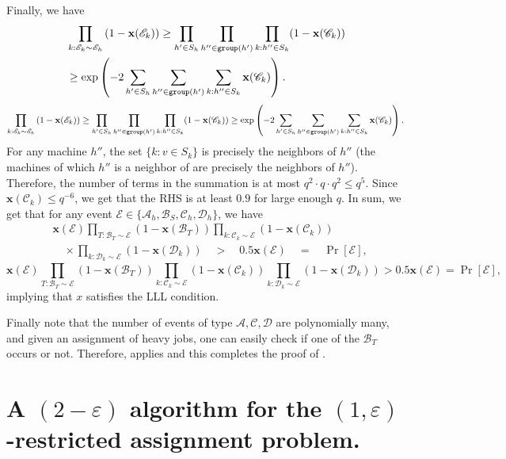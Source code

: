 \documentclass[11pt]{article}
\newcommand{\cA}{{\mathscr A}}
\newcommand{\cB}{\mathscr{B}}
\newcommand{\cC}{{\mathscr C}}
\newcommand{\cD}{\mathscr{D}}
\newcommand{\cE}{{\mathscr E}}
\newcommand{\eps}{\varepsilon}
\newcommand{\x}{{\mathbf x}}
\begin{document}
Finally, we have
\ifdefined\CR
\begin{align*}
&\prod_{k:\cE_k\sim \cE_h}\left(1-\x(\cE_k)\right) \geq \prod_{h' \in S_h} \prod_{h'' \in \group(h')} \prod_{k: h''\in S_k} (1-\x(\cC_k))\\
 &\geq \exp\left(-2\sum_{h'\in S_h}\sum_{h''\in \group(h')}\sum_{k: h''\in S_k} \x(\cC_k)\right).
\end{align*}
\else
$$\prod_{k:\cE_k\sim \cE_h}\left(1-\x(\cE_k)\right) \geq \prod_{h' \in S_h} \prod_{h'' \in \group(h')} \prod_{k: h''\in S_k} (1-\x(\cC_k)) \geq \exp\left(-2\sum_{h'\in S_h}\sum_{h''\in \group(h')}\sum_{k: h''\in S_k} \x(\cC_k)\right).$$
\fi
For any machine $h''$, the set $\{k: v\in S_k\}$ is precisely the neighbors of $h''$ (the machines of which $h''$ is a neighbor of are precisely the neighbors of $h''$). Therefore, the number of terms in the summation is at most 
$q^2\cdot q\cdot q^2 \leq q^5$. Since $\x(\cC_k) \leq q^{-6}$, we get that the RHS is at least $0.9$ for large enough $q$. In sum, we get that for any event $\cE \in \{\cA_h, \cB_S,\cC_h,\cD_h\}$, we have
\ifdefined\CR
\begin{align*}
&\x(\cE)\prod_{T:\cB_T\sim \cE} \left(1-\x(\cB_T)\right)\prod_{k:\cC_k\sim \cE}(1 - \x(\cC_k))\\
&\quad \times \prod_{k:\cD_k\sim \cE} (1- \x(\cD_k)) \quad >\quad 0.5\x(\cE) \quad = \quad \Pr[\cE],
\end{align*}
\else
$$\x(\cE)\prod_{T:\cB_T\sim \cE}\left(1-\x(\cB_T)\right) \prod_{k:\cC_k\sim \cE}(1 - \x(\cC_k)) \prod_{k:\cD_k\sim \cE} (1- \x(\cD_k)) > 0.5\x(\cE) = \Pr[\cE],$$
\fi
implying that $x$ satisfies the LLL condition. 

Finally note that the number of events of type $\cA,\cC,\cD$ are polynomially many, and given an assignment of heavy jobs, one can easily check if one of the $\cB_T$ occurs or not. Therefore,  applies  
and this completes the proof of .




\appendix
\section{A \texorpdfstring{$(2-\eps)$}{2-epsilon} algorithm for the \texorpdfstring{$(1,\eps)$}{(1,epsilon)}-restricted assignment problem.}
\label{app:large-eps}
\end{document}

